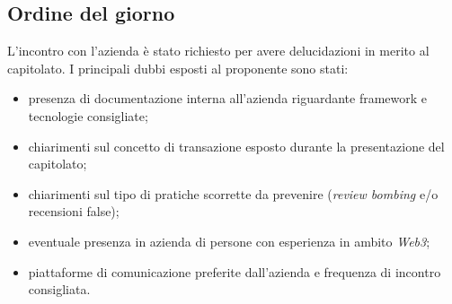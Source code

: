 \subsection{Ordine del giorno}
L'incontro con l'azienda è stato richiesto per avere delucidazioni in merito al capitolato. I principali dubbi esposti al proponente sono stati:
\begin{itemize}
	\item presenza di documentazione interna all'azienda riguardante framework e tecnologie consigliate;
	\item chiarimenti sul concetto di transazione esposto durante la presentazione del
	capitolato;
	\item chiarimenti sul tipo di pratiche scorrette da prevenire (\emph{review bombing} e/o recensioni false);
	\item eventuale presenza in azienda di persone con esperienza in ambito \emph{Web3};
	\item piattaforme di comunicazione preferite dall'azienda e frequenza di incontro
	consigliata.
\end{itemize}
